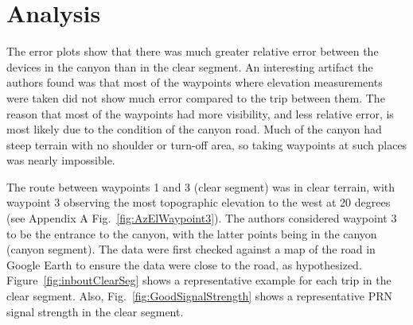 \documentclass[]{aiaa-tc}%
\begin{document}
	\section{Analysis}
	
	\noindent The error plots show that there was much greater relative error between the devices in the canyon than in the clear segment. An interesting artifact the authors found was that most of the waypoints where elevation measurements were taken did not show much error compared to the trip between them. The reason that most of the waypoints had more visibility, and less relative error, is most likely due to the condition of the canyon road. Much of the canyon had steep terrain with no shoulder or turn-off area, so taking waypoints at such places was nearly impossible.
		
	\vspace{5 mm}

	\noindent The route between waypoints 1 and 3 (clear segment) was in clear terrain, with waypoint 3 observing the most topographic elevation to the west at 20 degrees (see Appendix A Fig.~\ref{fig:AzElWaypoint3}). The authors considered waypoint 3 to be the entrance to the canyon, with the latter points being in the canyon (canyon segment). The data were first checked against a map of the road in Google Earth to ensure the data were close to the road, as hypothesized. Figure~\ref{fig:inboutClearSeg} shows a representative example for each trip in the clear segment. Also, Fig.~\ref{fig:GoodSignalStrength} shows a representative PRN signal strength in the clear segment.
	
\end{document}

